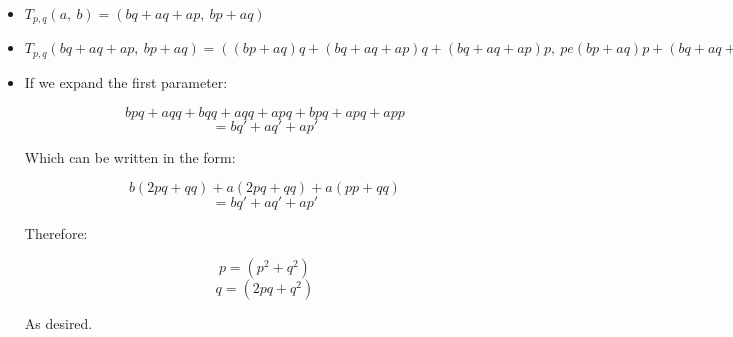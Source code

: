 \documentclass[12pt]{article}
\begin{document}
\begin{itemize}
	\item \( T_{p,q} (a ,\ b) = (bq + aq + ap ,\ bp + aq ) \)
	\item \( T_{p,q} (bq + aq + ap ,\ bp + aq ) = ( (bp + aq) q +
		(bq + aq + ap) q + (bq + aq + ap) p ,\ pe (bp + aq) p +
		(bq + aq + ap) q )) = (bq\prime + aq\prime + ap\prime ,\
		bp\prime + aq\prime)\)
	\item If we expand the first parameter:

		\[ bpq + aqq + bqq + aqq + apq + bpq + apq + app\]
		\[ = b q\prime + a q\prime + a p\prime \]

		Which can be written in the form:

		\[ b (2pq + qq) + a (2pq + qq) + a (pp + qq) \]
		\[ = b q\prime + a q\prime + a p\prime \] 

		Therefore:

		\[ p = (p ^2 + q ^2) \] 
		\[ q = (2pq + q ^2) \] 

		As desired.

\end{itemize}
\end{document}
